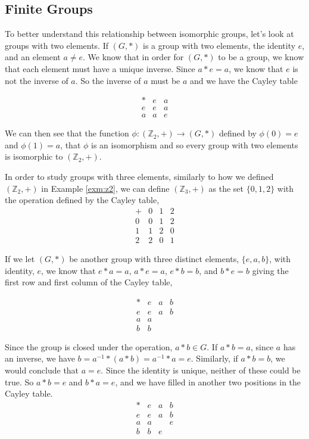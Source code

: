 \documentclass[
]{book}
\theoremstyle{definition}
\theoremstyle{definition}
\theoremstyle{definition}
\theoremstyle{definition}
\theoremstyle{remark}
\begin{document}
\hypertarget{finite-groups}{%
\subsection{Finite Groups}\label{finite-groups}}

To better understand this relationship between isomorphic groups, let's look at groups with two elements. If \((G,*)\) is a group with two elements, the identity \(e\), and an element \(a\neq e\). We know that in order for \((G,*)\) to be a group, we know that each element must have a unique inverse. Since \(a*e=a\), we know that \(e\) is not the inverse of \(a\). So the inverse of \(a\) must be \(a\) and we have the Cayley table

\[\begin{array}{c|cc}
* & e & a \\ \hline
e & e & a \\
a & a & e
\end{array}\]

We can then see that the function \(\phi:(\mathbb{Z}_2,+)\rightarrow (G,*)\) defined by \(\phi(0)=e\) and \(\phi(1)=a\), that \(\phi\) is an isomorphism and so every group with two elements is isomorphic to \((\mathbb{Z}_2,+)\).

In order to study groups with three elements, similarly to how we defined \((\mathbb{Z}_2,+)\) in Example \ref{exm:z2}, we can define
\((\mathbb{Z}_3,+)\) as the set \(\{0,1,2\}\) with the operation defined by the Cayley table,
\[\begin{array}{c|ccc}
    + & 0 & 1 & 2 \\ \hline
    0 & 0 & 1 & 2 \\
    1 & 1 & 2 & 0 \\
    2 & 2 & 0 & 1 
\end{array}\]

If we let \((G,*)\) be another group with three distinct elements, \(\{e,a,b\}\), with identity, \(e\), we know that \(e*a=a\), \(a*e=a\), \(e*b=b\), and \(b*e=b\) giving the first row and first column of the Cayley table,

\[\begin{array}{c|ccc}
    * & e & a & b \\ \hline
    e & e & a & b \\
    a & a &  &  \\
    b & b &  &  
\end{array}\]

Since the group is closed under the operation, \(a*b\in G\). If \(a*b=a\), since \(a\) has an inverse, we have \(b=a^{-1}*(a*b) = a^{-1}*a = e\). Similarly, if \(a*b=b\), we would conclude that \(a=e\). Since the identity is unique, neither of these could be true. So \(a*b=e\) and \(b*a=e\), and we have filled in another two positions in the Cayley table.
\[\begin{array}{c|ccc}
    * & e & a & b \\ \hline
    e & e & a & b \\
    a & a &  & e  \\
    b & b & e  & 
\end{array}\]
\end{document}

